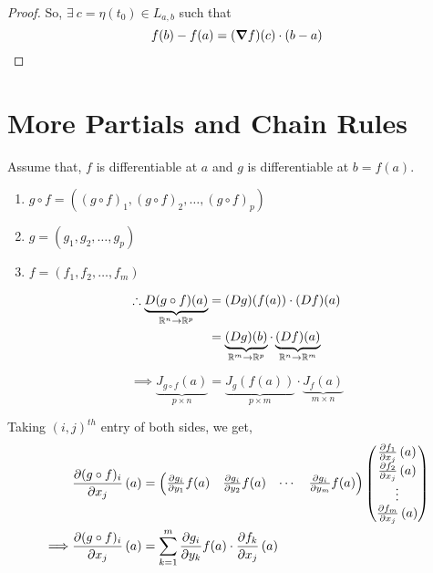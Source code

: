 \documentclass[../Analysis-3.tex]{subfiles}
\begin{document}
\begin{proof}
  So, $\exists\ c = \eta(t_0) \in L_{a,b}$ such that \[ f(b) - f(a) = (\grad f)(c)\cdot(b-a) \]
\end{proof}

\section{More Partials and Chain Rules}

Assume that, $f$ is differentiable at $a$ and $g$ is differentiable at $b = f(a)$.

\begin{notnBox}
  \begin{enumerate}
    \item $g \circ f = \left( (g \circ f)_1, (g \circ f)_2, \ldots, (g \circ f)_p \right)$
    \item $g = \left( g_1, g_2, \ldots, g_p \right)$
    \item $f = \left( f_1, f_2, \ldots, f_m \right)$
  \end{enumerate}
\end{notnBox}

\begin{align*}
  \therefore    \underbrace{D(g \circ f)(a)}_{\mathbb{R}^n \to \mathbb{R}^p} & = (Dg)(f(a))\cdot (Df)(a)                                                        \\
                                                             & = \underbrace{(Dg)(b)}_{\mathbb{R}^m \to \mathbb{R}^p}\cdot \underbrace{(Df)(a)}_{\mathbb{R}^n \to \mathbb{R}^m}
\end{align*}

\[\implies \underbrace{J_{g \circ f}(a)}_{p \times n} = \underbrace{J_{g}(f(a))}_{p \times m}\cdot \underbrace{J_{f}(a)}_{m \times n} \]

Taking $(i,j)^{th}$ entry of both sides, we get,
\begin{align*}
           & \pdv{(g\circ f)_{i}}{x_j}\left( a \right) = \begin{pmatrix}
                                                           \pdv{g_i}{y_1}f(a) & \pdv{g_i}{y_2}f(a) & \cdots & \pdv{g_i}{y_m}f(a)
                                                         \end{pmatrix} \begin{pmatrix}
                                                                         \pdv{f_1}{x_j}\left( a \right) \\
                                                                         \pdv{f_2}{x_j}\left( a \right) \\
                                                                         \vdots                         \\
                                                                         \pdv{f_m}{x_j}\left( a \right)
                                                                       \end{pmatrix}  \\
  \implies & \pdv{(g\circ f)_{i}}{x_j}\left( a \right) = \sum_{k = 1}^{m} \pdv{g_i}{y_k}f(a)\cdot\pdv{f_k}{x_j}\left( a \right)
\end{align*}
\end{document}

